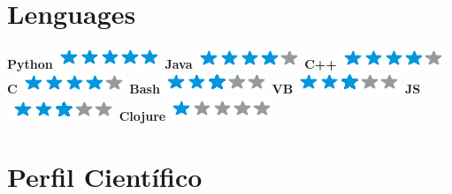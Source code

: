 \begin{aside}
	~
	~
	~
	~
	~
	~
	~
	~
	~
	~
	~
    \section{Lenguages}
    \textbf{Python}\includegraphics[scale=0.40]{img/5stars.png}
    \textbf{Java}\includegraphics[scale=0.40]{img/4stars.png}
    \textbf{C++}\includegraphics[scale=0.40]{img/4stars.png}
    \textbf{C}\includegraphics[scale=0.40]{img/4stars.png}
    \textbf{Bash}\includegraphics[scale=0.40]{img/3stars.png}
    \textbf{VB}\includegraphics[scale=0.40]{img/3stars.png}
    \textbf{JS}\includegraphics[scale=0.40]{img/3stars.png}
    \textbf{Clojure}\includegraphics[scale=0.40]{img/1stars.png}
	~
	~
	~
	~
	~
	~
	~
	~
	~
	~
	~
	~
	~
    \section{Perfil Científico}
\end{aside}
